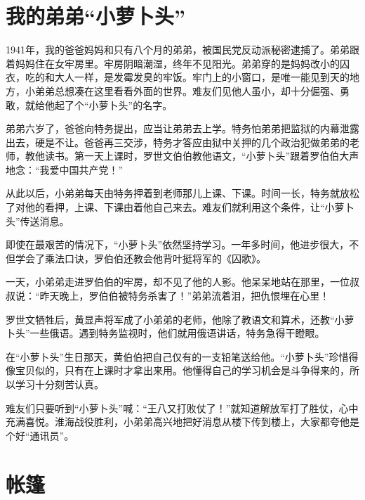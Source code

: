 \documentclass[12pt,UTF-8,openany]{ctexbook}
\begin{document}
\chapter{我的弟弟“小萝卜头”}

\begin{large}
    
    1941年，我的爸爸妈妈和只有八个月的弟弟，被国民党反动派秘密逮捕了。弟弟跟着妈妈住在女牢房里。牢房阴暗潮湿，终年不见阳光。弟弟穿的是妈妈改小的囚衣，吃的和大人一样，是发霉发臭的牢饭。牢门上的小窗口，是唯一能见到天的地方，小弟弟总想凑在这里看看外面的世界。难友们见他人虽小，却十分倔强、勇敢，就给他起了个“小萝卜头”的名字。
    
    弟弟六岁了，爸爸向特务提出，应当让弟弟去上学。特务怕弟弟把监狱的内幕泄露出去，硬是不让。爸爸再三交涉，特务才答应由狱中关押的几个政治犯做弟弟的老师，教他读书。第一天上课时，罗世文伯伯教他语文，“小萝卜头”跟着罗伯伯大声地念：“我爱中国共产党！”
    
    从此以后，小弟弟每天由特务押着到老师那儿上课、下课。时间一长，特务就放松了对他的看押，上课、下课由着他自己来去。难友们就利用这个条件，让“小萝卜头”传送消息。
    
    即使在最艰苦的情况下，“小萝卜头”依然坚持学习。一年多时间，他进步很大，不但学会了乘法口诀，罗伯伯还教会他背叶挺将军的《囚歌》。
    
    一天，小弟弟走进罗伯伯的牢房，却不见了他的人影。他呆呆地站在那里，一位叔叔说：“昨天晚上，罗伯伯被特务杀害了！”弟弟流着泪，把仇恨埋在心里！
    
    罗世文牺牲后，黄显声将军成了小弟弟的老师，他除了教语文和算术，还教“小萝卜头”一些俄语。遇到特务监视时，他们就用俄语讲话，特务急得干瞪眼。
    
    在“小萝卜头”生日那天，黄伯伯把自己仅有的一支铅笔送给他。“小萝卜头”珍惜得像宝贝似的，只有在上课时才拿出来用。他懂得自己的学习机会是斗争得来的，所以学习十分刻苦认真。
    
    难友们只要听到“小萝卜头”喊：“王八又打败仗了！”就知道解放军打了胜仗，心中充满喜悦。淮海战役胜利，小弟弟高兴地把好消息从楼下传到楼上，大家都夸他是个好“通讯员”。
    
\end{large}



\chapter{帐篷}
\end{document}
